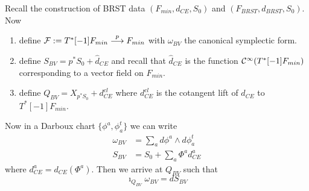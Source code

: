 \begin{example}[BV-BRST]
  Recall the construction of BRST data $(F_{min}, d_{CE}, S_0)$ and $(F_{BRST}, d_{BRST}, S_0)$. Now
  \begin{enumerate}
    \item define ${\mathcal{F}} := T^*[-1]F_{min} \overset{p}{\longrightarrow} F_{min}$ with $\omega_{BV}$ the canonical symplectic form.
    \item define $S_{BV} = p^* S_0 + \widehat{d}_{CE}$ and recall that $\widehat{d}_{CE}$ is the function $\mathcal{C}^{\infty}(T^*[-1]F_{min})$ corresponding to a vector field on $F_{min}$.
    \item define $Q_{BV} = X_{p^*S_0} + d_{CE}^{cl}$  where $d_{CE}^{cl}$ is the cotangent lift of $d_{CE}$ to $T^*[-1]F_{min}$.
  \end{enumerate}
  Now in a Darboux chart $\{\phi^a, \phi^t_a\}$ we can write
  \begin{align}
    \omega_{BV} &= \sum_a d\phi^a \wedge d\phi^t_a \\
    S_{BV} &= S_0 + \sum_a \Phi^a d^a_{CE}
  \end{align}
  where $d^a_{CE} = d_{CE}(\Phi^a)$. Then we arrive at $Q_{BV}$ such that
  \begin{equation}
    \imath_{Q_{BV}} \omega_{BV} = dS_{BV}
  \end{equation}
\end{example}




\newpage
